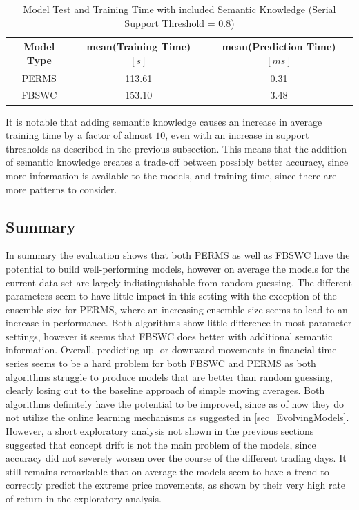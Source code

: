 \begin{table}
\vspace{0.5cm}
\caption[Runtime Performance (Including Semantic Knowledge)]{Model Test and Training Time with included Semantic Knowledge (Serial Support Threshold = $0.8$) \label{table_runtimeValsSemantic}}
\centering
\begin{tabular}{ c | c | c}		
  Model Type & mean(Training Time) $[s]$ & mean(Prediction Time) $[ms]$ \\
  \hline
  PERMS & 113.61 & 0.31\\
  FBSWC & 153.10 & 3.48\\
\end{tabular}
\vspace{0.5cm}
\end{table}

It is notable that adding semantic knowledge causes an increase in average training time by a factor of almost $10$, even with an increase in support thresholds as described in the previous subsection. This means that the addition of semantic knowledge creates a trade-off between possibly better accuracy, since more information is available to the models, and training time, since there are more patterns to consider.

\subsection{Summary}
In summary the evaluation shows that both PERMS as well as FBSWC have the potential to build well-performing models, however on average the models for the current data-set are largely indistinguishable from random guessing. The different parameters seem to have little impact in this setting with the exception of the ensemble-size for PERMS, where an increasing ensemble-size seems to lead to an increase in performance. Both algorithms show little difference in most parameter settings, however it seems that FBSWC does better with additional semantic information. Overall, predicting up- or downward movements in financial time series seems to be a hard problem for both FBSWC and PERMS as both algorithms struggle to produce models that are better than random guessing, clearly losing out to the baseline approach of simple moving averages. Both algorithms definitely have the potential to be improved, since as of now they do not utilize the online learning mechanisms as suggested in \ref{sec_EvolvingModels}. However, a short exploratory analysis not shown in the previous sections suggested that concept drift is not the main problem of the models, since accuracy did not severely worsen over the course of the different trading days. It still remains remarkable that on average the models seem to have a trend to correctly predict the extreme price movements, as shown by their very high rate of return in the exploratory analysis.